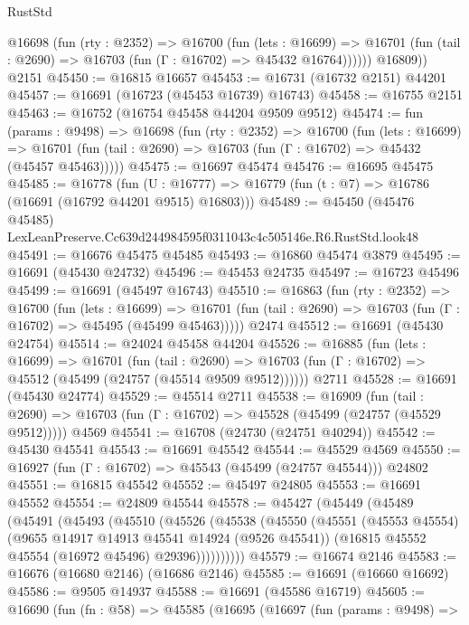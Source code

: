 \begin{lexlean}{RustStd}
\begin{coremodule}
          @16698
            (fun (rty : @2352) =>
            @16700
              (fun (lets : @16699) =>
              @16701 (fun (tail : @2690) => @16703 (fun (Γ : @16702) => @45432 @16764))))))
        @16809))
    @2151
@45450 := @16815 @16657
@45453 := @16731 (@16732 @2151) @44201
@45457 := @16691 (@16723 (@45453 @16739) @16743)
@45458 := @16755 @2151
@45463 := @16752 (@16754 @45458 @44204 @9509 @9512)
@45474 := fun (params : @9498) =>
  @16698
    (fun (rty : @2352) =>
    @16700
      (fun (lets : @16699) =>
      @16701 (fun (tail : @2690) => @16703 (fun (Γ : @16702) => @45432 (@45457 @45463)))))
@45475 := @16697 @45474
@45476 := @16695 @45475
@45485 := @16778
    (fun (U : @16777) => @16779 (fun (t : @7) => @16786 (@16691 (@16792 @44201 @9515) @16803)))
@45489 := @45450 (@45476 @45485) LexLeanPreserve.Cc639d244984595f0311043c4c505146e.R6.RustStd.look48
@45491 := @16676 @45475 @45485
@45493 := @16860 @45474 @3879
@45495 := @16691 (@45430 @24732)
@45496 := @45453 @24735
@45497 := @16723 @45496
@45499 := @16691 (@45497 @16743)
@45510 := @16863
    (fun (rty : @2352) =>
    @16700
      (fun (lets : @16699) =>
      @16701 (fun (tail : @2690) => @16703 (fun (Γ : @16702) => @45495 (@45499 @45463)))))
    @2474
@45512 := @16691 (@45430 @24754)
@45514 := @24024 @45458 @44204
@45526 := @16885
    (fun (lets : @16699) =>
    @16701
      (fun (tail : @2690) =>
      @16703 (fun (Γ : @16702) => @45512 (@45499 (@24757 (@45514 @9509 @9512))))))
    @2711
@45528 := @16691 (@45430 @24774)
@45529 := @45514 @2711
@45538 := @16909
    (fun (tail : @2690) => @16703 (fun (Γ : @16702) => @45528 (@45499 (@24757 (@45529 @9512)))))
    @4569
@45541 := @16708 (@24730 (@24751 @40294))
@45542 := @45430 @45541
@45543 := @16691 @45542
@45544 := @45529 @4569
@45550 := @16927 (fun (Γ : @16702) => @45543 (@45499 (@24757 @45544))) @24802
@45551 := @16815 @45542
@45552 := @45497 @24805
@45553 := @16691 @45552
@45554 := @24809 @45544
@45578 := @45427
    (@45449
      (@45489
        (@45491
          (@45493
            (@45510
              (@45526
                (@45538
                  (@45550
                    (@45551
                      (@45553 @45554)
                      (@9655 @14917 @14913 @45541 @14924 (@9526 @45541))
                      (@16815 @45552 @45554 (@16972 @45496) @29396))))))))))
@45579 := @16674 @2146
@45583 := @16676 (@16680 @2146) (@16686 @2146)
@45585 := @16691 (@16660 @16692)
@45586 := @9505 @14937
@45588 := @16691 (@45586 @16719)
@45605 := @16690
    (fun (fn : @58) =>
    @45585
      (@16695
        (@16697
          (fun (params : @9498) =>

\end{coremodule}
\end{lexlean}
